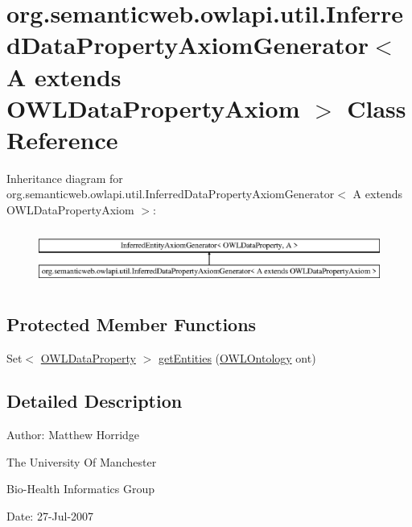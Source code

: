 \hypertarget{classorg_1_1semanticweb_1_1owlapi_1_1util_1_1_inferred_data_property_axiom_generator_3_01_a_01exbfc5b704ea6b718e158918a5652c43f4}{\section{org.\-semanticweb.\-owlapi.\-util.\-Inferred\-Data\-Property\-Axiom\-Generator$<$ A extends O\-W\-L\-Data\-Property\-Axiom $>$ Class Reference}
\label{classorg_1_1semanticweb_1_1owlapi_1_1util_1_1_inferred_data_property_axiom_generator_3_01_a_01exbfc5b704ea6b718e158918a5652c43f4}
}
Inheritance diagram for org.\-semanticweb.\-owlapi.\-util.\-Inferred\-Data\-Property\-Axiom\-Generator$<$ A extends O\-W\-L\-Data\-Property\-Axiom $>$\-:\begin{figure}[H]
\begin{center}
\leavevmode
\includegraphics[height=1.827080cm]{classorg_1_1semanticweb_1_1owlapi_1_1util_1_1_inferred_data_property_axiom_generator_3_01_a_01exbfc5b704ea6b718e158918a5652c43f4}
\end{center}
\end{figure}
\subsection*{Protected Member Functions}
\begin{DoxyCompactItemize}
\item 
Set$<$ \hyperlink{interfaceorg_1_1semanticweb_1_1owlapi_1_1model_1_1_o_w_l_data_property}{O\-W\-L\-Data\-Property} $>$ \hyperlink{classorg_1_1semanticweb_1_1owlapi_1_1util_1_1_inferred_data_property_axiom_generator_3_01_a_01exbfc5b704ea6b718e158918a5652c43f4_a7956933140ba1112ed1d42c1b846ada9}{get\-Entities} (\hyperlink{interfaceorg_1_1semanticweb_1_1owlapi_1_1model_1_1_o_w_l_ontology}{O\-W\-L\-Ontology} ont)
\end{DoxyCompactItemize}


\subsection{Detailed Description}
Author\-: Matthew Horridge\par
 The University Of Manchester\par
 Bio-\/\-Health Informatics Group\par
 Date\-: 27-\/\-Jul-\/2007\par
\par
 
